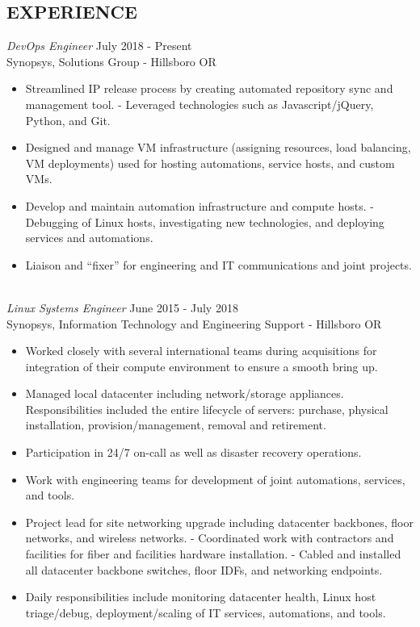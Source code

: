 \documentclass[line,margin]{res}
\begin{document}
\begin{resume}
\section{EXPERIENCE}
\vspace{25px}
\begin{adjustwidth}{-115pt}{0pt}
	{\sl DevOps Engineer}
		\hfill July 2018 - Present\\
		Synopsys, Solutions Group - Hillsboro OR
		\begin{itemize}
			\item Streamlined IP release process by creating automated repository sync and management tool.
				\subitem - Leveraged technologies such as Javascript/jQuery, Python, and Git. 
			\item Designed and manage VM infrastructure (assigning resources, load balancing, VM deployments) used for hosting automations, service hosts, and custom VMs.
			\item Develop and maintain automation infrastructure and compute hosts.
				\subitem - Debugging of Linux hosts, investigating new technologies, and deploying services and automations.
			\item Liaison and “fixer” for engineering and IT communications and joint projects.
		\end{itemize}
	\hfill\\
	{\sl Linux Systems Engineer}
		\hfill June 2015 - July 2018\\
		Synopsys, Information Technology and Engineering Support - Hillsboro OR
		\begin{itemize}
			\item Worked closely with several international teams during acquisitions for integration of their compute environment to ensure a smooth bring up.
			\item Managed local datacenter including network/storage appliances. Responsibilities included the entire lifecycle of servers: purchase, physical installation, provision/management, removal and retirement.
			\item Participation in 24/7 on-call as well as disaster recovery operations.
			\item Work with engineering teams for development of joint automations, services, and tools.
			\item Project lead for site networking upgrade including datacenter backbones, floor networks, and wireless networks.
				\subitem - Coordinated work with contractors and facilities for fiber and facilities hardware installation.
				\subitem - Cabled and installed all datacenter backbone switches, floor IDFs, and networking endpoints.
			\item Daily responsibilities include monitoring datacenter health, Linux host triage/debug, deployment/scaling of IT services, automations, and tools.
		\end{itemize}


\end{adjustwidth}
\end{resume}
\end{document}
